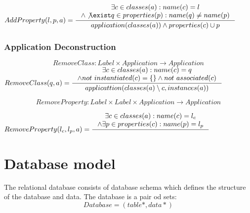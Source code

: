\documentclass[11pt]{article}
\begin{document}
$
AddProperty(l, p, a) = \inference{\exists c \in classes(a) : name(c) = l \\ \wedge \not \exist q \in properties(p) : name(q) \neq name(p)}{
application(classes(a)) \wedge properties(c) \cup p }
$


\subsubsection{Application Deconstruction}
$$RemoveClass: Label \times Application \rightarrow Application $$
$
RemoveClass(q, a) = \inference{\exists c \in classes(a) : name(c) = q \\
\wedge not$ $instantiated(c) = \{ \} \wedge not$ $associated(c)}{applicattion(classes(a) \setminus c, instances(a)) }
$

$$RemoveProperty: Label \times Label \times Application \rightarrow Application $$

$
RemoveProperty(l_c, l_p, a) = \inference{\exists c \in classes(a) : name(c) = l_c \\ \wedge \exists p \in properties(c) : name(p) = l_p}{}
$


\section{Database model}
The relational database consists of database schema which defines the structure of the database and data. The database is a pair od sets:
$$
Database = (table*, data*)
$$
\end{document}

